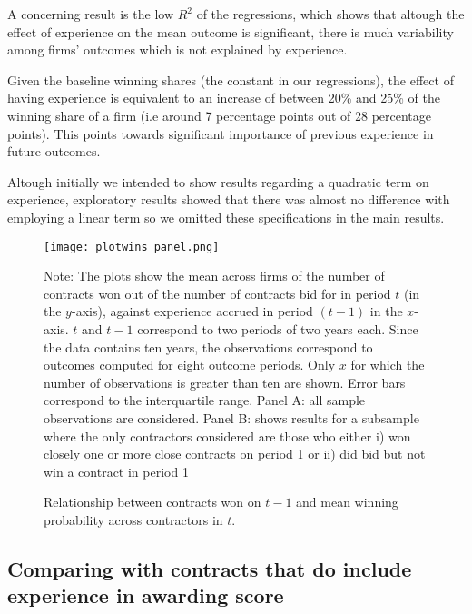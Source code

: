 A concerning result is the low $R^2$ of the regressions, which shows that altough the effect of experience on the mean outcome is significant, there is much variability among firms' outcomes which is not explained by experience.

Given the baseline winning shares (the constant in our regressions), the effect of having experience is equivalent to an increase of between 20\% and 25\% of the winning share of a firm (i.e around 7 percentage points out of 28 percentage points). This points towards significant importance of previous experience in future outcomes.

Altough initially we intended to show results regarding a quadratic term on experience, exploratory results showed that there was almost no difference with employing a linear term so we omitted these specifications in the main results.

\begin{figure}
  \texttt{[image: plotwins\_panel.png]}
  \caption{Relationship between contracts won on $t-1$ and mean winning probability across contractors in $t$.}
  \label{fig:plotresults_both}
  \vskip 0.5mm
  { \footnotesize \underline{Note:} The plots show the mean across firms of the number of contracts won out of the number of contracts bid for in period $t$ (in the $y$-axis), against experience accrued in period $(t-1)$ in the $x$-axis. $t$ and $t-1$ correspond to two periods of two years each. Since the data contains ten years, the observations correspond to outcomes computed for eight outcome periods.  Only $x$ for which the number of observations is greater than ten are shown. Error bars correspond to the interquartile range. Panel A: all sample observations are considered. Panel B:  shows results for a subsample where the only contractors considered are those who either i) won closely one or more close contracts  on period 1 or ii) did bid but not win a contract in period 1\par}
\end{figure}
\clearpage





\clearpage

\subsection{Comparing with contracts that do include experience in awarding score}


